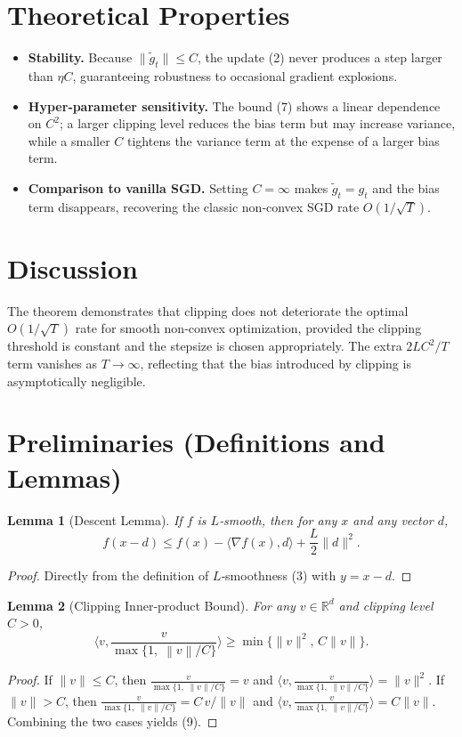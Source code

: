 \documentclass{article}
\newtheorem{lemma}{Lemma}
\newcommand{\R}{\mathbb{R}}
\newcommand{\norm}[1]{\left\|#1\right\|}
\newcommand{\clip}[2]{\frac{#1}{\max\{1,\; \norm{#1}/#2\}}}
\begin{document}
\section*{Theoretical Properties}
\begin{itemize}
\item \textbf{Stability.} Because $\|\tilde g_{t}\|\le C$, the update (2) never produces a step larger than $\eta C$, guaranteeing robustness to occasional gradient explosions.
\item \textbf{Hyper‑parameter sensitivity.} The bound (7) shows a linear dependence on $C^{2}$; a larger clipping level reduces the bias term but may increase variance, while a smaller $C$ tightens the variance term at the expense of a larger bias term.
\item \textbf{Comparison to vanilla SGD.} Setting $C=\infty$ makes $\tilde g_{t}=g_{t}$ and the bias term disappears, recovering the classic non‑convex SGD rate $O(1/\sqrt{T})$.
\end{itemize}

\section*{Discussion}
The theorem demonstrates that clipping does not deteriorate the optimal $O(1/\sqrt{T})$ rate for smooth non‑convex optimization, provided the clipping threshold is constant and the stepsize is chosen appropriately. The extra $2LC^{2}/T$ term vanishes as $T\to\infty$, reflecting that the bias introduced by clipping is asymptotically negligible.

\newpage

\section*{Preliminaries (Definitions and Lemmas)}
\begin{lemma}[Descent Lemma]\label{lem:descent}
If $f$ is $L$‑smooth, then for any $x$ and any vector $d$,
\[
f(x-d)\le f(x)-\langle\nabla f(x),d\rangle+\frac{L}{2}\|d\|^{2}.
\tag{8}
\]
\end{lemma}
\begin{proof}
Directly from the definition of $L$‑smoothness (3) with $y=x-d$.
\end{proof}

\begin{lemma}[Clipping Inner‑product Bound]\label{lem:clip-inner}
For any $v\in\R^{d}$ and clipping level $C>0$,
\[
\langle v,\clip{v}{C}\rangle \ge \min\bigl\{\|v\|^{2},\,C\|v\|\bigr\}.
\tag{9}
\]
\end{lemma}
\begin{proof}
If $\|v\|\le C$, then $\clip{v}{C}=v$ and $\langle v,\clip{v}{C}\rangle=\|v\|^{2}$.  
If $\|v\|>C$, then $\clip{v}{C}=C\,v/\|v\|$ and $\langle v,\clip{v}{C}\rangle=C\|v\|$.  Combining the two cases yields (9).
\end{proof}
\end{document}
